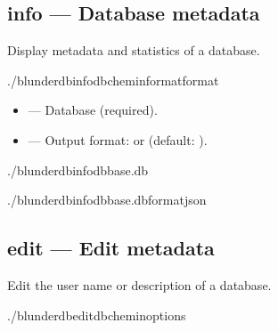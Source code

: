 \documentclass[letterpaper,10pt,english]{sphinxmanual}
\begin{document}
\subsection{info — Database metadata}
\label{\detokenize{cli:info-metadonnees-de-la-base}}
\sphinxAtStartPar
Display metadata and statistics of a database.

\begin{sphinxVerbatim}[commandchars=\\\{\}]
./blunderdbinfo\PYGZhy{}\PYGZhy{}db\PYGZlt{}chemin\PYGZgt{}\PYG{o}{[}\PYGZhy{}\PYGZhy{}format\PYGZlt{}format\PYGZgt{}\PYG{o}{]}
\end{sphinxVerbatim}

\sphinxAtStartPar
{}
\begin{itemize}
\item {} 
\sphinxAtStartPar
{} — Database (required).

\item {} 
\sphinxAtStartPar
{} — Output format:  or  (default: ).

\end{itemize}

\sphinxAtStartPar
{}

\begin{sphinxVerbatim}[commandchars=\\\{\}]
./blunderdbinfo\PYGZhy{}\PYGZhy{}dbbase.db

./blunderdbinfo\PYGZhy{}\PYGZhy{}dbbase.db\PYGZhy{}\PYGZhy{}formatjson
\end{sphinxVerbatim}


\subsection{edit — Edit metadata}
\label{\detokenize{cli:edit-modifier-les-metadonnees}}
\sphinxAtStartPar
Edit the user name or description of a database.

\begin{sphinxVerbatim}[commandchars=\\\{\}]
./blunderdbedit\PYGZhy{}\PYGZhy{}db\PYGZlt{}chemin\PYGZgt{}\PYG{o}{[}options\PYG{o}{]}
\end{sphinxVerbatim}
\end{document}
